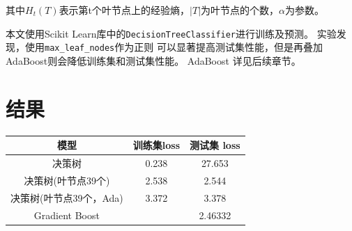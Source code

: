 \documentclass[a4paper, twocolumn]{article}
\begin{document}
其中$H_t(T)$表示第t个叶节点上的经验熵，$|T|$为叶节点的个数，$\alpha$为参数。

本文使用Scikit Learn库中的\lstinline[basicstyle=\ttfamily]|DecisionTreeClassifier|进行训练及预测\cite{scikit}。
实验发现，使用\lstinline[basicstyle=\ttfamily]|max_leaf_nodes|作为正则
可以显著提高测试集性能，但是再叠加AdaBoost则会降低训练集和测试集性能。
AdaBoost 详见后续章节。


\section{结果}

\begin{table}[h]
    \centering
    \begin{tabular}{ccc}
        \hline
        模型& 训练集loss& 测试集 loss \\
        \hline
        决策树& 0.238& 27.653 \\
        决策树(叶节点39个)& 2.538& 2.544 \\
        决策树(叶节点39个，Ada)& 3.372& 3.378 \\
        Gradient Boost& & 2.46332 \\
        \hline
    \end{tabular}
\end{table}

{}

\end{document}
